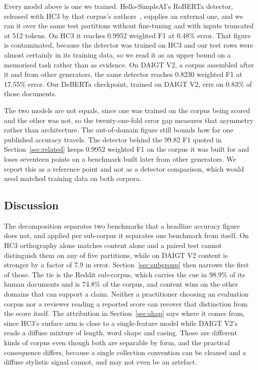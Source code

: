 \documentclass[conference,a4paper]{IEEEtran}
\begin{document}
Every model above is one we trained. Hello-SimpleAI's RoBERTa detector, released with HC3 by that corpus's authors~\cite{HelloSimpleAI2023detector}, supplies an external one, and we ran it over the same test partitions without fine-tuning and with inputs truncated at 512 tokens. On HC3 it reaches 0.9952 weighted F1 at 0.48\% error. That figure is contaminated, because the detector was trained on HC3 and our test rows were almost certainly in its training data, so we read it as an upper bound on a memorised task rather than as evidence. On DAIGT V2, a corpus assembled after it and from other generators, the same detector reaches 0.8230 weighted F1 at 17.55\% error. Our DeBERTa checkpoint, trained on DAIGT V2, errs on 0.83\% of those documents.

The two models are not equals, since one was trained on the corpus being scored and the other was not, so the twenty-one-fold error gap measures that asymmetry rather than architecture. The out-of-domain figure still bounds how far one published accuracy travels. The detector behind the 99.82 F1 quoted in Section~\ref{sec:related} keeps 0.9952 weighted F1 on the corpus it was built for and loses seventeen points on a benchmark built later from other generators. We report this as a reference point and not as a detector comparison, which would need matched training data on both corpora.

\subsection{Discussion}
\label{sec:discussion}

The decomposition separates two benchmarks that a headline accuracy figure does not, and applied per sub-corpus it separates one benchmark from itself. On HC3 orthography alone matches content alone and a paired test cannot distinguish them on any of five partitions, while on DAIGT V2 content is stronger by a factor of 7.9 in error. Section~\ref{sec:subgroup} then narrows the first of those. The tie is the Reddit sub-corpus, which carries the cue in 98.9\% of its human documents and is 74.8\% of the corpus, and content wins on the other domains that can support a claim. Neither a practitioner choosing an evaluation corpus nor a reviewer reading a reported score can recover that distinction from the score itself. The attribution in Section~\ref{sec:shap} says where it comes from, since HC3's surface arm is close to a single-feature model while DAIGT V2's reads a diffuse mixture of length, word shape and casing. Those are different kinds of corpus even though both are separable by form, and the practical consequence differs, because a single collection convention can be cleaned and a diffuse stylistic signal cannot, and may not even be an artefact.
\end{document}
